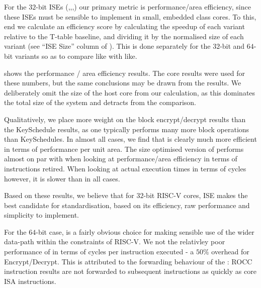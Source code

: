 For the $32$-bit ISEs 
(,,,)
our primary metric is
performance/area efficiency, since these ISEs must be sensible to
implement in small, embedded class cores.
To this, end we calculate an efficiency score by calculating the speedup
of each variant relative to the T-table baseline, and dividing it
by the normalised size of each variant
(see ``ISE Size'' column of ).
This is done separately for the $32$-bit and $64$-bit variants so as
to compare like with like.

 shows the performance / area efficiency results.
The  core results were used for these numbers, but the
same conclusions may be drawn from the  results.
We deliberately omit the size of the host core from our calculation,
as this dominates the total size of the system and detracts from
the comparison.

Qualitatively, we place more weight on the block encrypt/decrypt results
than the KeySchedule results, as one typically performs many more
block operations than KeySchedules.
In almost all cases, we find that  is clearly much more
efficient in terms of performance per unit area.
The size optimised version of  performs almost on par with
 when looking at performance/area efficiency in terms of
instructions retired.
When looking at actual execution times in terms of cycles however,
it is slower than  in all cases.

Based on these results, we believe that for $32$-bit RISC-V cores,
ISE  makes the best candidate for standardisation,
based on its efficiency, raw performance and simplicity to implement.

For the $64$-bit case,  is a fairly obvious choice for making
sensible use of the wider data-path within the constraints of RISC-V.
We not the relativley poor performance of  in terms of cycles
per instruction executed - a $50\%$ overhead for Encrypt/Decrypt.
This is attributed to the forwarding behaviour of the :
ROCC instruction results are not
forwarded to subsequent instructions as quickly as core ISA
instructions.

